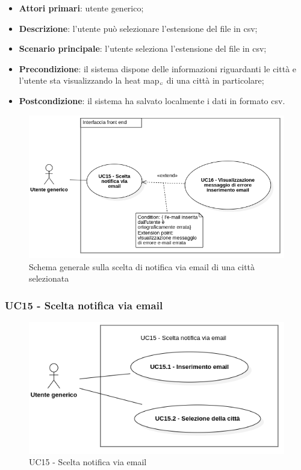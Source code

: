 \begin{itemize}
	\item \textbf{Attori primari}: utente generico;
	\item \textbf{Descrizione}: l’utente può selezionare l’estensione del file in csv;
	\item \textbf{Scenario principale}: l’utente seleziona l’estensione del file in csv;
	\item \textbf{Precondizione}: il sistema dispone delle informazioni riguardanti le città e  l’utente sta visualizzando la heat map$_{\scaleto{G}{3pt}}$ di una città in particolare;
	\item \textbf{Postcondizione}: il sistema ha salvato localmente i dati in formato csv.
\end{itemize}


\begin{center}
	\begin{figure}[H]
		\centering\includegraphics[scale=0.7]{../immagini/attori_casi/UC15.png}
		\caption{Schema generale sulla scelta di notifica via email di una città selezionata}
	\end{figure}
\end{center}

\subsubsection{UC15 - Scelta notifica via email }\label{CasiDUsoCasiDUsoFacoltativiTraUnUtenteEIlFrontEndElencoCasiDUsoUC15NotificaViaEmailDiUnaCittaSelezionata}

\begin{center}
	\begin{figure}[H]
		\centering\includegraphics[scale=0.7]{../immagini/attori_casi/UC15_1_2.png}
		\caption{UC15 - Scelta notifica via email}
	\end{figure}
\end{center}

